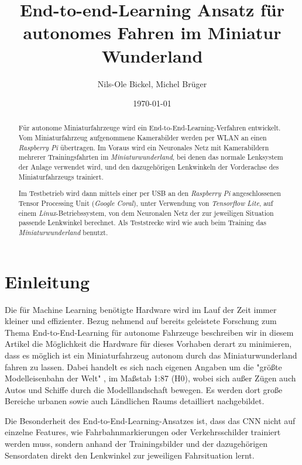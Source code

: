 \documentclass[a4paper, 12pt]{scrartcl}
\title{End-to-end-Learning Ansatz für autonomes Fahren im Miniatur Wunderland}
\author{Nils-Ole Bickel, Michel Brüger}
\date{\today}
\begin{document}
	
\maketitle



\begin{abstract}	
Für autonome Miniaturfahrzeuge wird ein End-to-End-Learning-Verfahren entwickelt. Vom Miniaturfahrzeug aufgenommene Kamerabilder werden per WLAN an einen \emph{Raspberry Pi} übertragen. Im Voraus wird ein Neuronales Netz mit Kamerabildern mehrerer Trainingsfahrten im \emph{Miniaturwunderland}, bei denen das normale Lenksystem der Anlage verwendet wird, und den dazugehörigen Lenkwinkeln der Vorderachse des Miniaturfahrzeugs trainiert. 

Im Testbetrieb wird dann mittels einer per USB an den \emph{Raspberry Pi} angeschlossenen Tensor Processing Unit (\emph{Google Coral}), unter Verwendung von \emph{Tensorflow Lite}, auf einem \emph{Linux}-Betriebssystem, von dem Neuronalen Netz der zur jeweiligen Situation passende Lenkwinkel berechnet.
Als Teststrecke wird wie auch beim Training das \emph{Miniaturwunderland} benutzt.
\end{abstract}
	


	
	\section{Einleitung}
	Die für Machine Learning benötigte Hardware wird im Lauf der Zeit immer kleiner und effizienter. Bezug nehmend auf bereits geleistete Forschung zum Thema End-to-End-Learning für autonome Fahrzeuge \cite{article} beschreiben wir in diesem Artikel die Möglichkeit die Hardware für dieses Vorhaben derart zu minimieren, dass es möglich ist ein Miniaturfahrzeug \cite{article2} autonom durch das Miniaturwunderland fahren zu lassen. Dabei handelt es sich nach eigenen Angaben um die "größte Modelleisenbahn der Welt"  \cite{miwula}, im Maßstab 1:87 (H0), wobei sich außer Zügen auch Autos und Schiffe durch die Modelllandschaft bewegen. Es werden dort große Bereiche urbanen sowie auch Ländlichen Raums detailliert nachgebildet.
	
	 Die Besonderheit des End-to-End-Learning-Ansatzes ist, dass das CNN nicht auf einzelne Features, wie Fahrbahnmarkierungen oder Verkehrsschilder trainiert werden muss, sondern anhand der Trainingsbilder und der dazugehörigen Sensordaten direkt den Lenkwinkel zur jeweiligen Fahrsituation lernt. 
\end{document}

